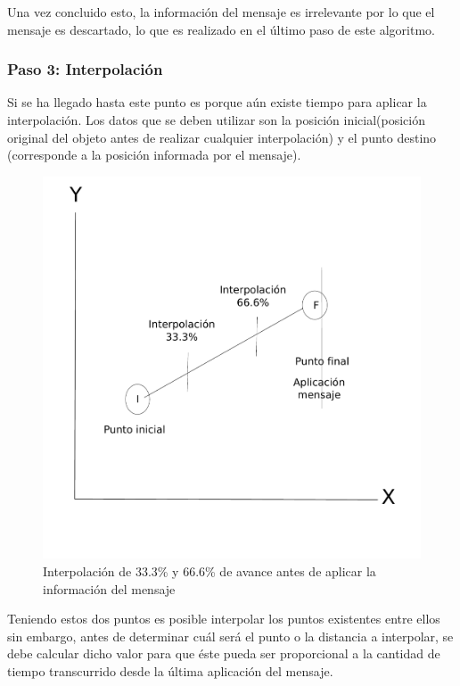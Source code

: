\documentclass[a4paper,12pt,openany,oneside]{book}
\begin{document}
Una vez concluido esto, la información del mensaje es irrelevante por lo que el mensaje es descartado, lo que es realizado en el último paso de este algoritmo.
\subsubsection{Paso 3: Interpolación}
Si se ha llegado hasta este punto es porque aún existe tiempo para aplicar la interpolación. Los datos que se deben utilizar son la posición inicial(posición original del objeto antes de realizar cualquier interpolación) y el punto destino (corresponde a la posición informada por el mensaje).

\begin{figure}
\begin{center}
\includegraphics[scale=.7]{interpolacion1.pdf}
\caption[Interpolación de 33.3\% y 66.6\% de avance]{Interpolación de 33.3\% y 66.6\% de avance antes de aplicar la información del mensaje}
\label{interpolacionlabel}
\end{center}
\end{figure}

Teniendo estos dos puntos es posible interpolar los puntos existentes entre ellos sin embargo, antes de determinar cuál será el punto o la distancia a interpolar, se debe calcular dicho valor para que éste pueda ser proporcional a la cantidad de tiempo transcurrido desde la última aplicación del mensaje.
\end{document}
